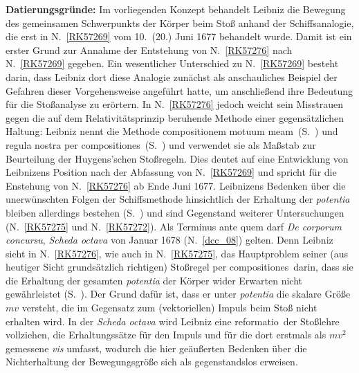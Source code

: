 \begin{ledgroup}
\footnotesize
\pstart
\noindent
\textbf{Datierungsgründe:} %
Im vorliegenden Konzept behandelt Leibniz die Bewegung des gemeinsamen Schwerpunkts der Körper beim Stoß
%
anhand der Schiffsanalogie, die erst in N.~\ref{RK57269} vom 10.\ (20.) Juni 1677 
%
behandelt wurde. Damit ist ein erster Grund zur Annahme der Entstehung von N.~\ref{RK57276} nach N.~\ref{RK57269} gegeben.
%
Ein wesentlicher Unterschied zu N.~\ref{RK57269} besteht darin,  
%
dass Leibniz dort diese Analogie zunächst als anschauliches Beispiel der Gefahren dieser Vorgehensweise angeführt hatte, 
um anschließend ihre Bedeutung für die Stoßanalyse zu erörtern.
%
In N.~\ref{RK57276} jedoch weicht sein Misstrauen gegen die auf dem Relativitätsprinzip beruhende Methode 
einer gegensätzlichen Haltung:
%
Leibniz nennt die Methode \glqq compositionem motuum meam\grqq\ (S.~) 
und \glqq regula nostra per compositiones\grqq\ (S.~)
%
und verwendet sie als Maßstab zur Beurteilung der \protect{}Huygens'schen Stoßregeln.
%
Dies deutet auf eine Entwicklung von Leibnizens Position nach der Abfassung von N.~\ref{RK57269} und spricht für
%
die Enstehung von N.~\ref{RK57276} ab Ende Juni 1677.
%
Leibnizens Bedenken über die unerwünschten Folgen der Schiffsmethode hinsichtlich der Erhaltung der \textit{potentia} bleiben allerdings bestehen (S.~) und sind Gegenstand weiterer Untersuchungen
%
(N.~\ref{RK57275} und N.~\ref{RK57272}).
\pend
%
\pstart
Als Terminus ante quem darf  \textit{De corporum concursu}, \textit{Scheda octava}  von Januar 1678 (N.~\ref{dcc_08}) gelten.
%
Denn Leibniz sieht in N.~\ref{RK57276}, wie auch in N.~\ref{RK57275}, das Hauptproblem seiner 
%
(aus heutiger Sicht grundsätzlich richtigen) Stoßregel \glqq per compositiones\grqq\ darin, dass 
%
sie die Erhaltung der gesamten \textit{potentia} der Körper wider Erwarten nicht gewährleistet
(S.~).
%
Der Grund dafür ist, dass er unter \textit{potentia} die skalare Größe $mv$ versteht, die im Gegensatz zum (vektoriellen) Impuls beim Stoß nicht erhalten wird.
%
In der \textit{Scheda octava} wird Leibniz eine \glqq reformatio\grqq\  der Stoßlehre vollziehen,
%
die Erhaltungssätze für den Impuls und für die dort erstmals als $mv^2$ gemessene \textit{vis} umfasst,
%
wodurch die hier geäußerten Bedenken über die Nichterhaltung der Bewegungsgröße sich als gegenstandslos erweisen.

\end{ledgroup}
